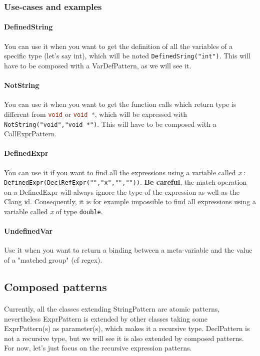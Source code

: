 \documentclass{report}
\begin{document}
\subsubsection{Use-cases and examples}

\paragraph{DefinedString}
You can use it when you want to get the definition of all the variables of a specific
 type (let's say int), which will be noted \lstinline|DefinedSring("int")|. This will have to be composed with a VarDefPattern, as we will see it.

\paragraph{NotString}
You can use it when you want to get the function calls which return type is
different from \lstinline[language=java]|void| or \lstinline[language=java]|void *|, which will be expressed with 
\lstinline|NotString("void","void *")|. This will have to be composed with a CallExprPattern.

\paragraph{DefinedExpr}
You can use it if you want to find all the expressions using a variable called \textit{x} : \lstinline|DefinedExpr(DeclRefExpr("","x","",""))|.
\textbf{Be careful}, the match operation on a DefinedExpr will always ignore the type of the expression as well as the Clang id. Consequently,
it is for example impossible to find all expressions using a variable called \textit{x} of type \lstinline|double|.

\paragraph{UndefinedVar}
Use it when you want to return a binding between a meta-variable and the value of a "matched group" (cf regex).

\subsection{Composed patterns}

\paragraph{}
\hspace{4mm}Currently, all the classes extending StringPattern are atomic patterns, nevertheless ExprPattern is extended by other classes taking some ExprPattern(s) as parameter(s), which
makes it a recursive type. DeclPattern is not a recursive type, but we will see it is also extended by composed patterns.
For now, let's just focus on the recursive expression patterns.
\end{document}
